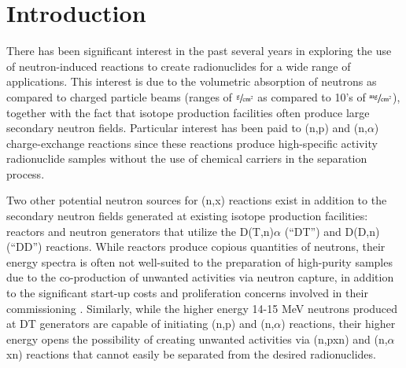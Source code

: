 \documentclass[5p]{elsarticle}
\begin{document}

\listoftodos


\section{Introduction} \label{sec:intro}

%
%
%

There has been significant interest in the past several years in exploring the use of neutron-induced reactions to create radionuclides for a wide range of applications.
This interest is due to the volumetric absorption of neutrons as compared to charged particle beams (ranges of $\sfrac{\text{g}}{\text{cm}^2}$ as compared to 10's of $\sfrac{\text{mg}}{\text{cm}^2}$), together with the fact that isotope production facilities often produce large secondary neutron fields.
 Particular interest has been paid to (n,p) and (n,$\alpha$) charge-exchange reactions since these reactions produce high-specific activity radionuclide samples without the use of chemical carriers in the separation process.
 

Two other potential neutron sources for (n,x) reactions exist in addition to the secondary neutron fields generated at existing isotope production facilities: reactors and neutron generators that utilize the D(T,n)$\alpha$ (\enquote{DT}) and D(D,n) (\enquote{DD}) reactions.
 While reactors produce copious quantities of neutrons, their energy spectra is often not well-suited to the preparation of high-purity samples due to the co-production of unwanted activities via neutron capture, in addition to the significant start-up costs and proliferation concerns involved in their commissioning \cite{Updegraff2013}.
 Similarly, while the higher energy 14-15 MeV neutrons produced at DT generators are capable of initiating (n,p) and (n,$\alpha$) reactions, their higher energy opens the possibility of creating unwanted activities via (n,pxn) and (n,$\alpha$xn) reactions that cannot easily be separated from the desired radionuclides.
 
\end{document}
